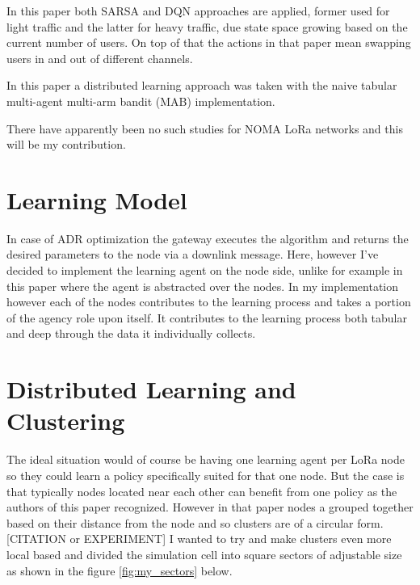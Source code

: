 In this paper \cite{rl_lora_sarsa_dqn} both SARSA and DQN
approaches are applied, former used for light traffic and the
latter for heavy traffic, due state space growing based on the 
current number of users. On top of that the actions in 
that paper mean swapping users in and out of different channels.

In this paper \cite{rl_distributed_mab} a distributed learning approach was taken with the naive tabular multi-agent multi-arm bandit (MAB) implementation.

There have apparently been no such studies for NOMA LoRa 
networks and this will be my contribution. 

\section{Learning Model}

In case of ADR optimization the gateway executes the algorithm
and returns the desired parameters to the node via a downlink 
message. Here, however I've decided to implement the learning 
agent on the node side, unlike for example in this paper 
\cite{rl_lora_sarsa_dqn} where the agent is abstracted over the
nodes. In my implementation however each of the nodes
contributes to the learning process and takes a portion of the
agency role upon itself. It contributes to the learning process
both tabular and deep through the data it individually collects.

\section{Distributed Learning and Clustering}
The ideal situation would of course be having one learning agent
per LoRa node so they could learn a policy specifically suited for that one node. But the case is that typically nodes located 
near each other can benefit from one policy as the authors of this paper \cite{rl_lora_original} recognized. However 
in that paper nodes a grouped together based on their 
distance from the node and so clusters are of a circular 
form. [CITATION or EXPERIMENT] I wanted to try and make clusters
even more local based and divided the simulation cell into 
square sectors of adjustable size as shown in the figure 
\ref{fig:my_sectors} below.

